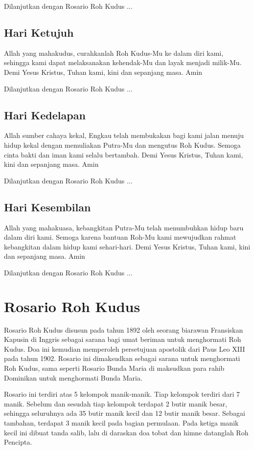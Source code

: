 Dilanjutkan dengan Rosario Roh Kudus ...

\subsection*{Hari Ketujuh}
Allah yang mahakudus, curahkanlah Roh Kudus-Mu ke dalam diri kami,
sehingga kami dapat melaksanakan kehendak-Mu dan layak menjadi
milik-Mu. Demi Yesus Kristus, Tuhan kami, kini dan sepanjang masa. Amin

Dilanjutkan dengan Rosario Roh Kudus ...

\subsection*{Hari Kedelapan}
Allah sumber cahaya kekal, Engkau telah membukakan bagi kami jalan
menuju hidup kekal dengan memuliakan Putra-Mu dan mengutus Roh Kudus.
Semoga cinta bakti dan iman kami selalu bertambah. Demi Yesus Kristus,
Tuhan kami, kini dan sepanjang masa. Amin

Dilanjutkan dengan Rosario Roh Kudus ...

\subsection*{Hari Kesembilan}
Allah yang mahakuasa, kebangkitan Putra-Mu telah menumbuhkan hidup baru
dalam diri kami. Semoga karena bantuan Roh-Mu kami mewujudkan rahmat
kebangkitan dalam hidup kami sehari-hari. Demi Yesus Kristus, Tuhan
kami, kini dan sepanjang masa. Amin

Dilanjutkan dengan Rosario Roh Kudus ...

\section{Rosario Roh Kudus}
Rosario Roh Kudus disusun pada tahun 1892 oleh seorang biarawan
Fransiskan Kapusin di Inggris sebagai sarana bagi umat beriman untuk
menghormati Roh Kudus. Doa ini kemudian memperoleh persetujuan
apostolik dari Paus Leo XIII pada tahun 1902. Rosario ini dimaksudkan
sebagai sarana untuk menghormati Roh Kudus, sama seperti Rosario Bunda
Maria di maksudkan para rahib Dominikan untuk menghormati Bunda Maria.

Rosario ini terdiri atas 5 kelompok manik-manik. Tiap kelompok terdiri
dari 7 manik. Sebelum dan sesudah tiap kelompok terdapat 2 butir manik
besar, sehingga seluruhnya ada 35 butir manik kecil dan 12 butir manik
besar. Sebagai tambahan, terdapat 3 manik kecil pada bagian permulaan.
Pada ketiga manik kecil ini dibuat tanda salib, lalu di daraskan doa
tobat dan himne datanglah Roh Pencipta.

